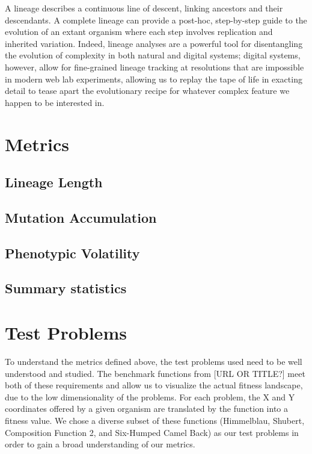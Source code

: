 \documentclass[letterpaper]{article}
\begin{document}
A lineage describes a continuous line of descent, linking ancestors and their descendants. A complete lineage can provide a post-hoc, step-by-step guide to the evolution of an extant organism where each step involves replication and inherited variation. Indeed, lineage analyses are a powerful tool for disentangling the evolution of complexity in both natural and digital systems; digital systems, however, allow for fine-grained lineage tracking at resolutions that are impossible in modern web lab experiments, allowing us to replay the tape of life in exacting detail to tease apart the evolutionary recipe for whatever complex feature we happen to be interested in. 



\section{Metrics}

\subsection{Lineage Length}
\subsection{Mutation Accumulation} 
\subsection{Phenotypic Volatility}

\subsection{Summary statistics}

\section{Test Problems}
To understand the metrics defined above, the test problems used need to be well understood and studied. The benchmark functions from [URL OR TITLE?] meet both of these requirements and allow us to visualize the actual fitness landscape, due to the low dimensionality of the problems. For each problem, the X and Y coordinates offered by a given organism are translated by the function into a fitness value. We chose a diverse subset of these functions (Himmelblau, Shubert, Composition Function 2, and Six-Humped Camel Back) as our test problems in order to gain a broad understanding of our metrics.
\end{document}
